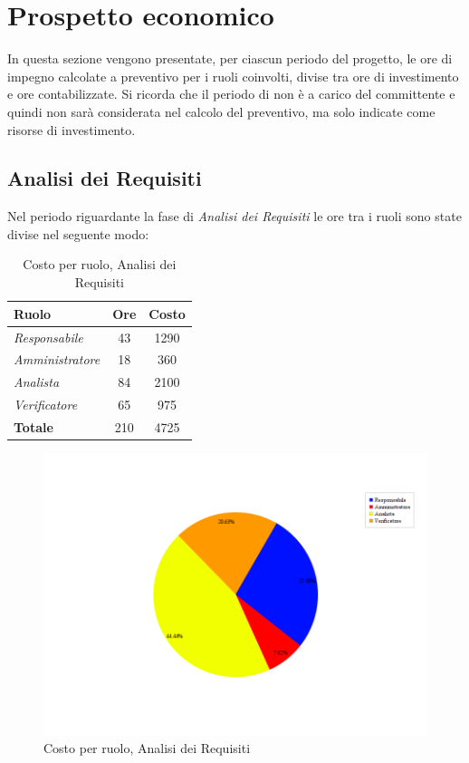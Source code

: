\section{Prospetto economico}
In questa sezione vengono presentate, per ciascun periodo del progetto, le ore di impegno calcolate a preventivo per i ruoli coinvolti, divise tra ore di investimento e ore contabilizzate. Si ricorda che il periodo di \textit{\Adr} non è a carico del committente e quindi non sarà considerata nel calcolo del preventivo, ma solo indicate come risorse di investimento.
\subsection{Analisi dei Requisiti}
Nel periodo riguardante la fase di \textit{Analisi dei Requisiti} le ore tra i ruoli sono state divise nel seguente modo:

\begin{table}[H]
	\begin{center}
		\begin{tabular}{|l|c|c|}
			\hline
			\textbf{Ruolo}	& \textbf{Ore} & \textbf{Costo} \\
			\hline
			\textit{Responsabile	}&	43	&	 1290	\\
			\hline
			\textit{Amministratore}	&	18	&	 360	\\
			\hline
			\textit{Analista}		&	84	&	 2100	\\
			\hline
			\textit{Verificatore}	&	65	&	 975	\\
			\hline
			\textbf{Totale} &	210	&	4725	\\
			\hline
		\end{tabular}
	\end{center}
	\caption{Costo per ruolo, Analisi dei Requisiti}
\end{table}

\begin{figure}[H]
	\centering
	\includegraphics[scale=0.4]{immagini/Grafi/CostoAR}
	\caption{Costo per ruolo, Analisi dei Requisiti}
\end{figure}

